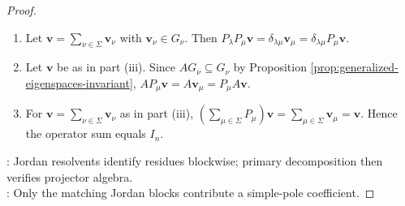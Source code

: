 \begin{proposition}
\begin{proof}
\begin{enumerate}[label=(\roman*)]
The identity $R_A(z)=SR_J(z)S^{-1}$ holds by direct multiplication. Set $H_{\nu}\defeq\mathcal{G}_{\nu}(J)$ and $C_{\mu}\defeq[R_J]_{\mu,-1}$.\\
By part (i), $C_{\mu}$ is the identity on a block with eigenvalue $\mu$ and zero on the Laurent coefficient of every block regular at $\mu$.\\
Hence $C_{\mu}|_{H_{\nu}}=\delta_{\mu\nu}I_{H_{\nu}}$. For $r\in\mathbb{Z}_{\geq0}$, $(A-\nu I_n)^rS=S(J-\nu I_n)^r$ by induction, so $SH_{\nu}=G_{\nu}$. Thus $[R_A]_{\mu,-1}=SC_{\mu}S^{-1}=P_{\mu}$.
\item Let $\mathbf{v}=\sum\limits_{\nu\in\Sigma}\mathbf{v}_{\nu}$ with $\mathbf{v}_{\nu}\in G_{\nu}$. Then $P_{\lambda}P_{\mu}\mathbf{v}=\delta_{\lambda\mu}\mathbf{v}_{\mu}=\delta_{\lambda\mu}P_{\mu}\mathbf{v}$.
\item Let $\mathbf{v}$ be as in part (iii). Since $AG_{\nu}\subseteq G_{\nu}$ by Proposition \ref{prop:generalized-eigenspaces-invariant}, $AP_{\mu}\mathbf{v}=A\mathbf{v}_{\mu}=P_{\mu}A\mathbf{v}$.
\item For $\mathbf{v}=\sum\limits_{\nu\in\Sigma}\mathbf{v}_{\nu}$ as in part (iii), $\left(\sum\limits_{\mu\in\Sigma}P_{\mu}\right)\mathbf{v}=\sum\limits_{\mu\in\Sigma}\mathbf{v}_{\mu}=\mathbf{v}$. Hence the operator sum equals $I_n$.
\end{enumerate}
: Jordan resolvents identify residues blockwise; primary decomposition then verifies projector algebra.\\
: Only the matching Jordan blocks contribute a simple-pole coefficient.
\end{proof}
\end{proposition}

